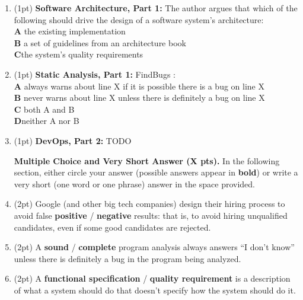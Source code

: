 \documentclass{report}
\newif\ifkey
\newcommand{\correct}[1]{\ifkey\color{red}\textbf{#1}\color{black}\else\textbf{#1}\fi\xspace}
\newcommand*{\pts}[1]{\addtocounter{points}{#1}(#1pt)}
\begin{document}
\begin{spacing}{1.4}
\begin{enumerate}[leftmargin=*]
\item \pts{1}
  \textbf{Software Architecture, Part 1:}
  The author argues that which of the following should drive the design of a software system’s architecture:
  \\ \textbf{A}\hspace{0.2in} the existing implementation
  \\ \textbf{B}\hspace{0.2in} a set of guidelines from an architecture book
  \\ \correct{C}\hspace{0.2in}the system’s quality requirements

\item \pts{1}
  \textbf{Static Analysis, Part 1:}
  FindBugs \underline{\hspace{1in}}:
  \\ \textbf{A}\hspace{0.2in} always warns about line X if it is possible there is a bug on line X
  \\ \textbf{B}\hspace{0.2in} never warns about line X unless there is definitely a bug on line X
  \\ \textbf{C}\hspace{0.2in} both A and B
  \\ \correct{D}\hspace{0.2in}neither A nor B

\item \pts{1}
  \textbf{DevOps, Part 2:}
  TODO

  \newpage

  \textbf{Multiple Choice and Very Short Answer (X pts).} In the following section, either circle your
  answer (possible answers appear in \textbf{bold}) or write a very short (one word or one phrase) answer in the space provided.

\item \pts{2} Google (and other big tech companies) design their hiring process
  to avoid false \correct{positive} / \textbf{negative} results: that is, to avoid hiring unqualified candidates,
  even if some good candidates are rejected.

\item \pts{2} A \textbf{sound} / \correct{complete} program analysis always answers ``I don't know'' unless there
  is definitely a bug in the program being analyzed.

\item \pts{2} A \correct{functional specification} / \textbf{quality requirement} is a description of what a system should do that doesn’t specify how the system should do it.


\end{enumerate}
\end{spacing}
\end{document}
